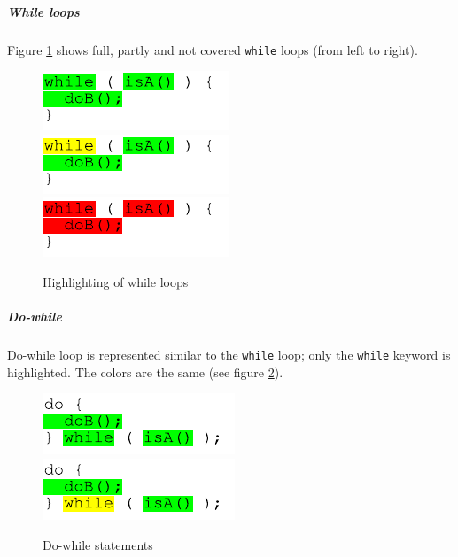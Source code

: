\subparagraph{While loops}
Figure \ref{ui_fg:While statements} shows full, partly and not covered \texttt{while} loops (from left to right).
\begin{figure}[hbt]
 \hfill
 \includegraphics[]{images/Source_Code_Highlighting/while/while_green}
 \hfill
 \includegraphics[]{images/Source_Code_Highlighting/while/while_yellow}
 \hfill
 \includegraphics[]{images/Source_Code_Highlighting/while/while_red}
 \hfill
 \caption{Highlighting of while loops}
 \label{ui_fg:While statements}
\end{figure}
\par

\subparagraph{Do-while}
Do-while loop is represented similar to the \texttt{while} loop; only the \texttt{while} keyword is highlighted. The colors are the same (see figure \ref{ui_fg:Do-while statements}).
\begin{figure}[hbt]
 \hfill
 \includegraphics[]{images/Source_Code_Highlighting/do-while/do-while_green}
 \hfill
 \includegraphics[]{images/Source_Code_Highlighting/do-while/do-while_yellow}
 \hspace{2cm}
 \caption{Do-while statements}
 \label{ui_fg:Do-while statements}
\end{figure}
\par

